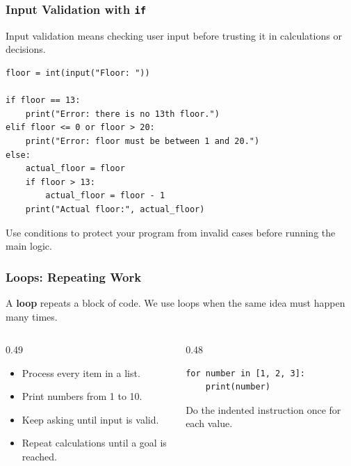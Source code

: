 \documentclass[aspectratio=169,10pt]{beamer}
\newcommand{\keyword}[1]{\textcolor{PrimaryBlue}{\textbf{#1}}}
\newcommand{\myitem}[1]{\item #1\vspace{0.04cm}}
\begin{document}
\begin{frame}[fragile]
\frametitle{Input Validation with \texttt{if}}
\begin{tcolorbox}[lecturebox,title=Key idea]
Input validation means checking user input before trusting it in calculations or decisions.
\end{tcolorbox}

\begin{lstlisting}[style=pycodesmall]
floor = int(input("Floor: "))

if floor == 13:
    print("Error: there is no 13th floor.")
elif floor <= 0 or floor > 20:
    print("Error: floor must be between 1 and 20.")
else:
    actual_floor = floor
    if floor > 13:
        actual_floor = floor - 1
    print("Actual floor:", actual_floor)
\end{lstlisting}

\begin{tcolorbox}[lecturebox,title=Beginner takeaway]
Use conditions to protect your program from invalid cases before running the main logic.
\end{tcolorbox}
\end{frame}


\begin{frame}[fragile]
\frametitle{Loops: Repeating Work}
\begin{tcolorbox}[lecturebox,title=Key idea]
A \keyword{loop} repeats a block of code. We use loops when the same idea must happen many times.
\end{tcolorbox}

\begin{columns}[T,totalwidth=\textwidth]
\begin{column}{0.49\textwidth}
\begin{itemize}\setlength\itemsep{0.04cm}
  \myitem{Process every item in a list.}
  \myitem{Print numbers from 1 to 10.}
  \myitem{Keep asking until input is valid.}
  \myitem{Repeat calculations until a goal is reached.}
\end{itemize}
\end{column}
\begin{column}{0.48\textwidth}
\begin{lstlisting}[style=pycode]
for number in [1, 2, 3]:
    print(number)
\end{lstlisting}
\begin{tcolorbox}[lecturebox,title=Beginner interpretation]
Do the indented instruction once for each value.
\end{tcolorbox}
\end{column}
\end{columns}
\end{frame}
\end{document}

